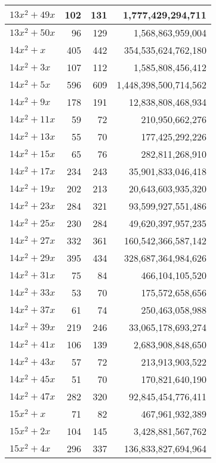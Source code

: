 \documentclass[a4paper]{amsproc}
\theoremstyle{plain}
\theoremstyle{named}
\begin{document}
\begin{longtable}{ | l | r | r | r | }
$13x^2 + 49x$ & 102 & 131 & 1{,}777{,}429{,}294{,}711 \\ \hline
$13x^2 + 50x$ & 96 & 129 & 1{,}568{,}863{,}959{,}004 \\ \hline
$14x^2 + x$ & 405 & 442 & 354{,}535{,}624{,}762{,}180 \\ \hline
$14x^2 + 3x$ & 107 & 112 & 1{,}585{,}808{,}456{,}412 \\ \hline
$14x^2 + 5x$ & 596 & 609 & 1{,}448{,}398{,}500{,}714{,}562 \\ \hline
$14x^2 + 9x$ & 178 & 191 & 12{,}838{,}808{,}468{,}934 \\ \hline
$14x^2 + 11x$ & 59 & 72 & 210{,}950{,}662{,}276 \\ \hline
$14x^2 + 13x$ & 55 & 70 & 177{,}425{,}292{,}226 \\ \hline
$14x^2 + 15x$ & 65 & 76 & 282{,}811{,}268{,}910 \\ \hline
$14x^2 + 17x$ & 234 & 243 & 35{,}901{,}833{,}046{,}418 \\ \hline
$14x^2 + 19x$ & 202 & 213 & 20{,}643{,}603{,}935{,}320 \\ \hline
$14x^2 + 23x$ & 284 & 321 & 93{,}599{,}927{,}551{,}486 \\ \hline
$14x^2 + 25x$ & 230 & 284 & 49{,}620{,}397{,}957{,}235 \\ \hline
$14x^2 + 27x$ & 332 & 361 & 160{,}542{,}366{,}587{,}142 \\ \hline
$14x^2 + 29x$ & 395 & 434 & 328{,}687{,}364{,}984{,}626 \\ \hline
$14x^2 + 31x$ & 75 & 84 & 466{,}104{,}105{,}520 \\ \hline
$14x^2 + 33x$ & 53 & 70 & 175{,}572{,}658{,}656 \\ \hline
$14x^2 + 37x$ & 61 & 74 & 250{,}463{,}058{,}988 \\ \hline
$14x^2 + 39x$ & 219 & 246 & 33{,}065{,}178{,}693{,}274 \\ \hline
$14x^2 + 41x$ & 106 & 139 & 2{,}683{,}908{,}848{,}650 \\ \hline
$14x^2 + 43x$ & 57 & 72 & 213{,}913{,}903{,}522 \\ \hline
$14x^2 + 45x$ & 51 & 70 & 170{,}821{,}640{,}190 \\ \hline
$14x^2 + 47x$ & 282 & 320 & 92{,}845{,}454{,}776{,}411 \\ \hline
$15x^2 + x$ & 71 & 82 & 467{,}961{,}932{,}389 \\ \hline
$15x^2 + 2x$ & 104 & 145 & 3{,}428{,}881{,}567{,}762 \\ \hline
$15x^2 + 4x$ & 296 & 337 & 136{,}833{,}827{,}694{,}964 \\ \hline

\end{longtable}
\end{document}
